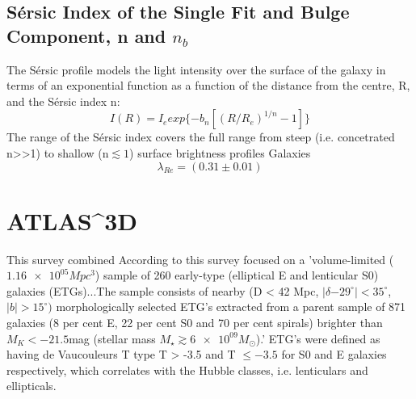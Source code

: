 \subsection{S\'ersic Index of the Single Fit and Bulge Component, n and $n_{b}$}
The S\'ersic profile models the light intensity over the surface of the galaxy in terms of an exponential function as a function of the distance from the centre, R, and the S\'ersic index n:
\begin{equation}
I(R) = I_{e} exp\{-b_{n} [(R/R_{e})^{1/n}-1]\}
\end{equation}
The range of the S\'ersic index covers the full range from steep (i.e. concetrated n>>1) to shallow (n$\lesssim 1$) surface brightness profiles %
Galaxies 
\begin{equation}
\lambda_{Re}=(0.31\pm0.01)
\end{equation}
\section{ATLAS^{3D}}
This survey combined 
According to \cite{Cappellari2011}
this survey focused on a 'volume-limited ($\num{1.16e05} Mpc^{3}$) sample of 260 early-type (elliptical E and lenticular S0) galaxies (ETGs)...The sample consists of nearby (D < 42 Mpc, $|\delta \num{-29}^{\circ}| < 35^{\circ}$, $|b| > 15^{\circ})$ morphologically selected ETG's extracted from a parent sample of 871 galaxies (8 per cent E, 22 per cent S0 and
70 per cent spirals) brighter than $M_{K} <\num{-21.5} $mag (stellar mass $M_{\star} \gtrsim \num{6e09} M_{\odot}$).' ETG's were defined as having de Vaucouleurs T type T > -3.5 and T $\leq -3.5$ for S0 and E galaxies respectively, which correlates with the Hubble classes, i.e. lenticulars and ellipticals. 


